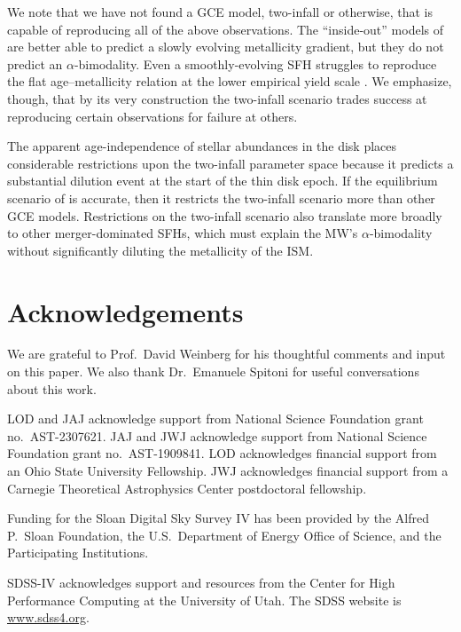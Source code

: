 \documentclass[twocolumn,twocolappendix,linenumbers]{aastex631}
\begin{document}
We note that we have not found a GCE model, two-infall or otherwise, that is capable of reproducing all of the above observations. The ``inside-out'' models of \citet{johnson_stellar_2021} are better able to predict a slowly evolving metallicity gradient, but they do not predict an $\alpha$-bimodality. Even a smoothly-evolving SFH struggles to reproduce the flat age--metallicity relation at the lower empirical yield scale \citep{johnson_milky_2024}. We emphasize, though, that by its very construction the two-infall scenario trades success at reproducing certain observations for failure at others.

The apparent age-independence of stellar abundances in the disk places considerable restrictions upon the two-infall parameter space because it predicts a substantial dilution event at the start of the thin disk epoch. If the equilibrium scenario of \citet{johnson_milky_2024} is accurate, then it restricts the two-infall scenario more than other GCE models. Restrictions on the two-infall scenario also translate more broadly to other merger-dominated SFHs, which must explain the MW's $\alpha$-bimodality without significantly diluting the metallicity of the ISM.

\section*{Acknowledgements}

We are grateful to Prof.\ David Weinberg for his thoughtful comments and input on this paper. We also thank Dr.\ Emanuele Spitoni for useful conversations about this work.

LOD and JAJ acknowledge support from National Science Foundation grant no.\ AST-2307621. JAJ and JWJ acknowledge support from National Science Foundation grant no.\ AST-1909841.
LOD acknowledges financial support from an Ohio State University Fellowship.
JWJ acknowledges financial support from a Carnegie Theoretical Astrophysics Center postdoctoral fellowship.

Funding for the Sloan Digital Sky 
Survey IV has been provided by the 
Alfred P.\ Sloan Foundation, the U.S.\ 
Department of Energy Office of 
Science, and the Participating 
Institutions. 

SDSS-IV acknowledges support and 
resources from the Center for High 
Performance Computing  at the 
University of Utah. The SDSS 
website is \url{www.sdss4.org}.
\end{document}
